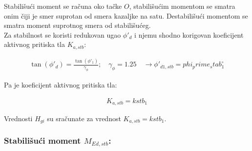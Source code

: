 \documentclass[a4paper, 11pt]{article}
\begin{document}
\noindent Stabili\v{s}u\'ci moment se ra\v{c}una oko ta\v{c}ke $O$, stabili\v{s}u\'cim momentom se smatra onim \v{c}iji je smer suprotan od smera kazaljke na satu. Destabili\v{s}u\'ci momentom se smatra moment suprotnog smera od stabili\v{s}u\'ceg. \\
Za stabilnost se koristi redukovan ugao $\phi'_d$ i njemu shodno korigovan koeficijent aktivnog pritiska tla $K_{a,stb}$:

\begin{align*}
\tan (\phi'_d) = \frac{\tan(\phi'_1)}{\gamma_{\phi}}; \quad \gamma_{\phi} = 1.25 \quad \rightarrow \phi'_{d1,stb} = phi_prime_stab_1 ^\circ
\end{align*}

Pa je koeficijent aktivnog pritiska tla:

\begin{align*}
K_{a,stb} = kstb_1
\end{align*}

Vrednosti $H_{gi}$ su sra\v{c}unate za vrednost $K_{a,stb} = kstb_1$.

\subsubsection*{Stabili\v{s}u\'ci moment $M_{Ed,stb}$:}
\end{document}
